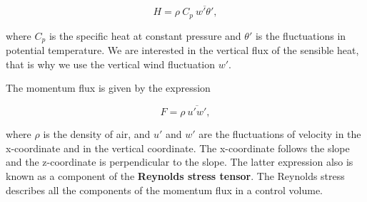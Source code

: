 \begin{equation}
    H = \rho \ C_p \ \overline{w'\theta'},
\end{equation}

\noindent where $C_p$ is the specific heat at constant pressure and $\theta '$ is the fluctuations in potential temperature. We are interested in the vertical flux of the sensible heat, that is why we use the vertical wind fluctuation $w'$.

The momentum flux is given by the expression

\begin{equation}
    F = \rho \ \overline{u'w'}, 
\end{equation}

\noindent where $\rho$ is the density of air, and $u'$ and $w'$ are the fluctuations of velocity in the x-coordinate and in the vertical coordinate. The x-coordinate follows the slope and the z-coordinate is perpendicular to the slope. The latter expression also is known as a component of the \textbf{Reynolds stress tensor}. The Reynolds stress describes all the components of the momentum flux in a control volume.
